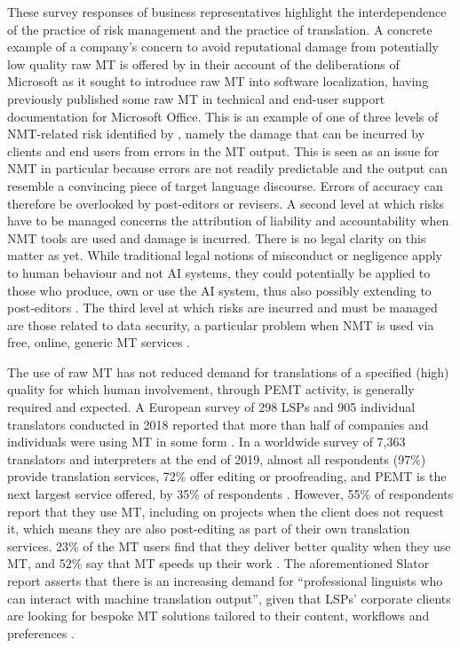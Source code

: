 \documentclass[output=paper,colorlinks,citecolor=brown]{langsci/langscibook}
\begin{document}
These survey responses of business representatives highlight the interdependence of the practice of risk management and the practice of translation. A concrete example of a company’s concern to avoid reputational damage from potentially low quality raw MT is offered by \citet{schmidtke_automatic_2019} in their account of the deliberations of Microsoft as it sought to introduce raw MT into software localization, having previously published some raw MT in technical and end-user support documentation for Microsoft Office. This is an example of one of three levels of NMT-related risk identified by \citet{canfora_risks_2020}, namely the damage that can be incurred by clients and end users from errors in the MT output. This is seen as an issue for NMT in particular because errors are not readily predictable and the output can resemble a convincing piece of target language discourse. Errors of accuracy can therefore be overlooked by post-editors or revisers. A second level at which risks have to be managed concerns the attribution of liability and accountability when NMT tools are used and damage is incurred. There is no legal clarity on this matter  as yet. While traditional legal notions of misconduct or negligence apply to human behaviour and not AI systems, they could potentially be applied to those who produce, own or use the AI system, thus also possibly extending to post-editors \citep[63]{canfora_risks_2020}. The third level at which risks are incurred and must be managed are those related to data security, a particular problem when NMT is used via free, online, generic MT services \citeyearpar[64]{canfora_risks_2020}.

The use of raw MT has not reduced demand for translations of a specified (high) quality for which human involvement, through PEMT activity, is generally required and expected. A European survey of 298 LSPs and 905 individual translators conducted in 2018 reported that more than half of companies and individuals were using MT in some form \citep{elia_2018_2018}. In a worldwide survey of 7,363 translators and interpreters at the end of 2019, almost all respondents (97\%) provide translation services, 72\% offer editing or proofreading, and PEMT is the next largest service offered, by 35\% of respondents \citep{pielmeier_state_2020}. However, 55\% of respondents report that they use MT, including on projects when the client does not request it, which means they are also post-editing as part of their own translation services. 23\% of the MT users find that they deliver better quality when they use MT, and 52\% say that MT speeds up their work \citep[45]{pielmeier_state_2020}. The aforementioned Slator report asserts that there is an increasing demand for \enquote{professional linguists who can interact with machine translation output}, given that LSPs’ corporate clients are looking for bespoke MT solutions tailored to their content, workflows and preferences \citep[22]{faes_slator_2019}. 
\end{document}
